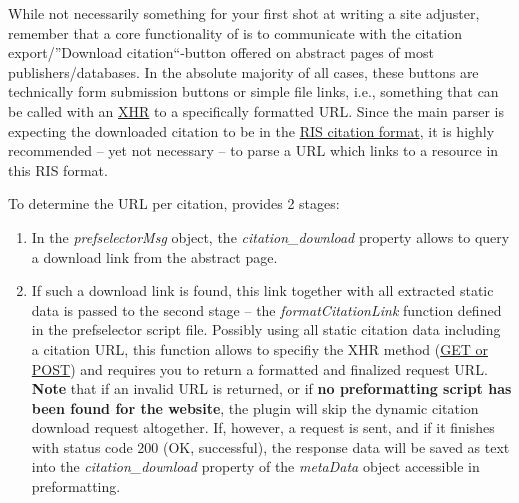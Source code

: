 \documentclass[
a4paper,
12pt,
]
{article}
\begin{document}
While not necessarily something for your first shot at writing a site adjuster, remember that a core functionality of {\plgname} is to communicate with the citation export/''Download citation``-button offered on abstract pages of most publishers/databases. In the absolute majority of all cases, these buttons are technically form submission buttons or simple file links, i.e., something that can be called with an \href{https://developer.mozilla.org/en-US/docs/Web/API/XMLHttpRequest}{XHR} to a specifically formatted URL.
Since the main parser is expecting the downloaded citation to be in the \href{https://en.wikipedia.org/wiki/RIS_(file_format)}{RIS citation format}, it is highly recommended -- yet not necessary -- to parse a URL which links to a resource in this RIS format.\par

To determine the URL per citation, {\plgname} provides 2 stages:
\begin{enumerate}
 \item In the \textit{prefselectorMsg} object, the \textit{citation\_download} property allows to query a download link from the abstract page.
 \item If such a download link is found, this link together with all extracted static data is passed to the second stage -- the \textit{formatCitationLink} function defined in the prefselector script file. Possibly using all static citation data including a citation URL, this function allows to specifiy the XHR method (\href{https://en.wikipedia.org/wiki/XMLHttpRequest#The_open_method}{GET or POST}) and requires you to return a formatted and finalized  request URL. \textbf{Note} that if an invalid URL is returned, or if \textbf{no preformatting script has been found for the website}, the plugin will skip the dynamic citation download request altogether.
 If, however, a request is sent, and if it finishes with status code 200 (OK, successful), the response data will be saved as text into the \textit{citation\_download} property of the \textit{metaData} object accessible in preformatting. 
\end{enumerate}
\end{document}
